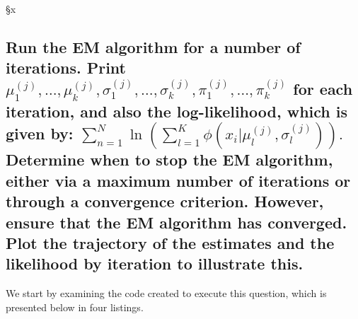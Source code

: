 §x\documentclass[]{article}
\begin{document}
\subsection{Run the EM algorithm for a number of iterations. Print 
	$\mu_1^{(j)}, \dots, \mu_k^{(j)}, \sigma_1^{(j)}, \dots, \sigma_k^{(j)}, \pi_1^{(j)}, \dots, \pi_k^{(j)}$ 
	for each iteration, and also the log-likelihood, which is given by:
	$
	\sum_{n=1}^{N} \ln \left( \sum_{l=1}^{K} \phi(x_i | \mu_l^{(j)}, \sigma_l^{(j)}) \right).
	$
	Determine when to stop the EM algorithm, either via a maximum number of iterations or through a convergence criterion. However, ensure that the EM algorithm has converged. Plot the trajectory of the estimates and the likelihood by iteration to illustrate this.
}


We start by examining the code created to execute this question, which is presented below in four listings.
\end{document}
